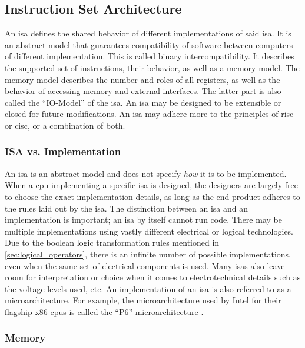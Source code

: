 \subsection{Instruction Set Architecture}

An \ac{isa} defines the shared behavior of different implementations of said \ac{isa}. It is an abstract model that guarantees compatibility of software between computers of different implementation. This is called binary intercompatibility. It describes the supported set of instructions, their behavior, as well as a memory model. The memory model describes the number and roles of all registers, as well as the behavior of accessing memory and external interfaces. The latter part is also called the ``IO-Model'' of the \ac{isa}. An \ac{isa} may be designed to be extensible or closed for future modifications. An \ac{isa} may adhere more to the principles of \ac{risc} or \ac{cisc}, or a combination of both.

\subsubsection{ISA vs. Implementation} \label{sec:isa_vs_implementation}

An \ac{isa} is an abstract model and does not specify \textit{how} it is to be implemented. When a \ac{cpu} implementing a specific \ac{isa} is designed, the designers are largely free to choose the exact implementation details, as long as the end product adheres to the rules laid out by the \ac{isa}. The distinction between an \ac{isa} and an implementation is important; an \ac{isa} by itself cannot run code. There may be multiple implementations using vastly different electrical or logical technologies. Due to the boolean logic transformation rules mentioned in \autoref{sec:logical_operators}, there is an infinite number of possible implementations, even when the same set of electrical components is used. Many \acp{isa} also leave room for interpretation or choice when it comes to electrotechnical details such as the voltage levels used, etc. An implementation of an \ac{isa} is also referred to as a microarchitecture. For example, the microarchitecture used by Intel for their flagship x86 \acp{cpu} is called the ``P6'' microarchitecture \cite{intel1997p6}.

\subsubsection{Memory} \label{sec:fundamentals_isa_memory}

